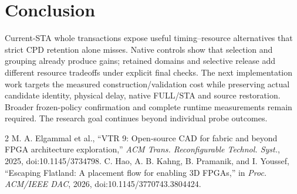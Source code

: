 \documentclass[conference,10pt]{IEEEtran}
\begin{document}
\section{Conclusion}
Current-STA whole transactions expose useful timing--resource alternatives that strict CPD retention alone misses. Native controls show that selection and grouping already produce gains; retained domains and selective release add different resource tradeoffs under explicit final checks. The next implementation work targets the measured construction/validation cost while preserving actual candidate identity, physical delay, native FULL/STA and source restoration. Broader frozen-policy confirmation and complete runtime measurements remain required. The research goal continues beyond individual probe outcomes.

\begin{thebibliography}{2}
 M. A. Elgammal et al., ``VTR 9: Open-source CAD for fabric and beyond FPGA architecture exploration,'' \emph{ACM Trans. Reconfigurable Technol. Syst.}, 2025, doi:10.1145/3734798.
 C. Hao, A. B. Kahng, B. Pramanik, and I. Youssef, ``Escaping Flatland: A placement flow for enabling 3D FPGAs,'' in \emph{Proc. ACM/IEEE DAC}, 2026, doi:10.1145/3770743.3804424.
\end{thebibliography}
\end{document}
